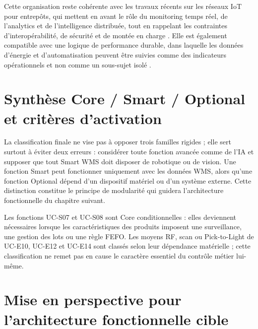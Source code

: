 Cette organisation reste cohérente avec les travaux récents sur les réseaux IoT pour entrepôts, qui mettent en avant le rôle du monitoring temps réel, de l’analytics et de l’intelligence distribuée, tout en rappelant les contraintes d’interopérabilité, de sécurité et de montée en charge \cite{ref12}. Elle est également compatible avec une logique de performance durable, dans laquelle les données d’énergie et d’automatisation peuvent être suivies comme des indicateurs opérationnels et non comme un sous-sujet isolé \cite{ref13}.



\section{Synthèse Core / Smart / Optional et critères d’activation}

\label{sec:3.9}

La classification finale ne vise pas à opposer trois familles rigides ; elle sert surtout à éviter deux erreurs : considérer toute fonction avancée comme de l’IA et supposer que tout Smart WMS doit disposer de robotique ou de vision. Une fonction Smart peut fonctionner uniquement avec les données WMS, alors qu’une fonction Optional dépend d’un dispositif matériel ou d’un système externe. Cette distinction constitue le principe de modularité qui guidera l’architecture fonctionnelle du chapitre suivant.





Les fonctions UC-S07 et UC-S08 sont Core conditionnelles : elles deviennent nécessaires lorsque les caractéristiques des produits imposent une surveillance, une gestion des lots ou une règle FEFO. Les moyens RF, scan ou Pick-to-Light de UC-E10, UC-E12 et UC-E14 sont classés selon leur dépendance matérielle ; cette classification ne remet pas en cause le caractère essentiel du contrôle métier lui-même.


\section{Mise en perspective pour l’architecture fonctionnelle cible}

\label{sec:3.10}


